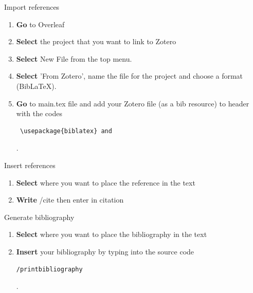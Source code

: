 \documentclass[10pt,a4paper]{article}
\begin{document}
 
 \begin{textbox}{Import references}
 

  

\begin{enumerate}
\item \textbf {Go} to Overleaf 
\item \textbf {Select} the project that you want to link to Zotero
\item \textbf {Select} New File from the top menu.
\item \textbf {Select} 'From Zotero', name the file for the project and choose a format (BibLaTeX).
\item \textbf {Go} to main.tex file and add your Zotero file (as a bib resource) to header with the codes \begin{verbatim} \usepackage{biblatex} and \end{verbatim}.
\end{enumerate}

\end{textbox}

  

  \begin{textbox}{Insert references}
 

  

\begin{enumerate}
\item \textbf {Select} where you want to place the reference in the text
\item \textbf {Write} /cite{} then enter in citation
\end{enumerate}

\end{textbox}

  

 \begin{textbox}{Generate bibliography}
 

  

\begin{enumerate}
\item \textbf {Select} where you want to place the bibliography in the text
\item \textbf{Insert} your bibliography by typing into the source code \begin{verbatim}/printbibliography\end{verbatim}.
\end{enumerate}

\end{textbox}
\end{document}
